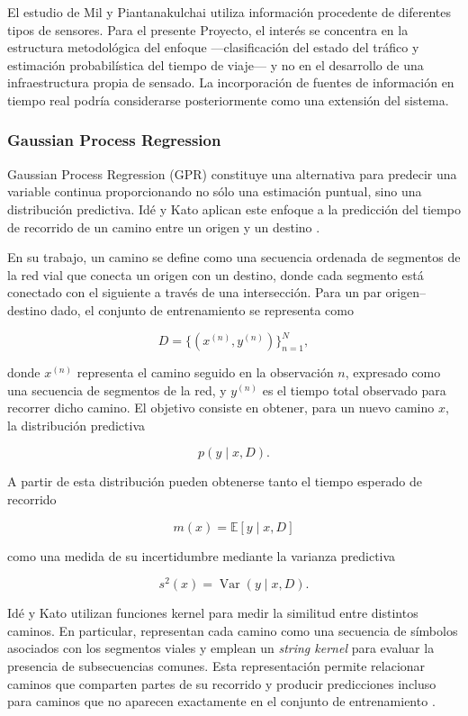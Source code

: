 \documentclass[11pt]{article}
\begin{document}
El estudio de Mil y Piantanakulchai utiliza información procedente de diferentes tipos
de sensores. Para el presente Proyecto, el interés se concentra en la estructura
metodológica del enfoque ---clasificación del estado del tráfico y estimación
probabilística del tiempo de viaje--- y no en el desarrollo de una infraestructura
propia de sensado. La incorporación de fuentes de información en tiempo real podría
considerarse posteriormente como una extensión del sistema.

\subsubsection*{Gaussian Process Regression}

Gaussian Process Regression (GPR) constituye una alternativa para predecir una
variable continua proporcionando no sólo una estimación puntual, sino una distribución
predictiva. Idé y Kato aplican este enfoque a la predicción del tiempo de recorrido
de un camino entre un origen y un destino \parencite{ide_kato_2009}.

En su trabajo, un camino se define como una secuencia ordenada de segmentos de la
red vial que conecta un origen con un destino, donde cada segmento está conectado
con el siguiente a través de una intersección. Para un par origen--destino dado, el conjunto de entrenamiento se representa como

\[
D=\{(x^{(n)},y^{(n)})\}_{n=1}^{N},
\]

donde \(x^{(n)}\) representa el camino seguido en la observación \(n\), expresado
como una secuencia de segmentos de la red, y \(y^{(n)}\) es el tiempo total observado
para recorrer dicho camino. El objetivo consiste en obtener, para un nuevo camino
\(x\), la distribución predictiva

\[
p(y\mid x,D).
\]

A partir de esta distribución pueden obtenerse tanto el tiempo esperado de recorrido

\[
m(x)=\mathbb{E}[y\mid x,D]
\]

como una medida de su incertidumbre mediante la varianza predictiva

\[
s^2(x)=\operatorname{Var}(y\mid x,D).
\]

Idé y Kato utilizan funciones kernel para medir la similitud entre distintos caminos.
En particular, representan cada camino como una secuencia de símbolos asociados con
los segmentos viales y emplean un \textit{string kernel} para evaluar la presencia de
subsecuencias comunes. Esta representación permite relacionar caminos que comparten
partes de su recorrido y producir predicciones incluso para caminos que no aparecen
exactamente en el conjunto de entrenamiento \parencite{ide_kato_2009}.
\end{document}
